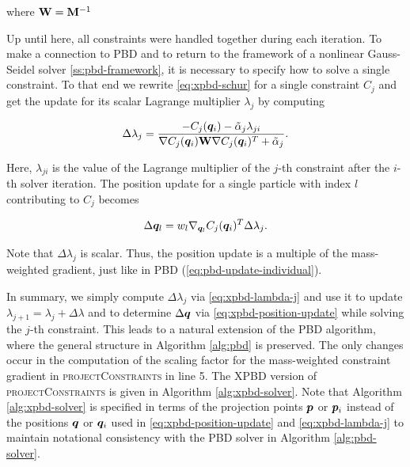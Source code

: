 \noindent where $\mathbf{W} = \mathbf{M}^{-1}$

Up until here, all constraints were handled together during each iteration. To make a connection to PBD and to return to the framework of a
nonlinear Gauss-Seidel solver \cref{ss:pbd-framework}, it is necessary to specify how to solve a single constraint. To that end we rewrite 
\autoref{eq:xpbd-schur} for a single constraint $C_j$ and get the update for its scalar Lagrange multiplier $\lambda_j$ by computing

\begin{equation}\label{eq:xpbd-lambda-j}
    \Delta \lambda_j = \frac{-C_j(\bm{q}_i) - \tilde{\alpha}_j \lambda_{ji}}{\nabla C_j(\bm{q}_i) \mathbf{W} \nabla C_j(\bm{q}_i)^T + \tilde{\alpha}_j}.
\end{equation}

\noindent Here, $\lambda_{ji}$ is the value of the Lagrange multiplier of the $j$-th constraint after the $i$-th solver iteration. The position update for 
a single particle with index $l$ contributing to $C_j$ becomes

\begin{equation}\label{eq:xpbd-position-update-i}
    \Delta \bm{q}_l = w_l \nabla_{\bm{q}_l} C_j(\bm{q}_i)^T \Delta \lambda_j.
\end{equation}

\noindent Note that $\Delta \lambda_j$ is scalar. Thus, the position update is a multiple of the mass-weighted gradient, just like in PBD 
(\cref{eq:pbd-update-individual}).

In summary, we simply compute $\Delta \lambda_j$ via \autoref{eq:xpbd-lambda-j} and use it to 
update $\lambda_{j+1} = \lambda_j + \Delta \lambda$ and to determine $\Delta \bm{q}$ via \autoref{eq:xpbd-position-update} while solving the $j$-th constraint. 
This leads to a natural extension of the PBD algorithm, where the general structure in Algorithm \ref{alg:pbd} is preserved. The only changes occur in the 
computation of the scaling factor for the 
mass-weighted constraint gradient in \textsc{projectConstraints} in line 5. The XPBD version of \textsc{projectConstraints} is given in 
Algorithm \ref{alg:xpbd-solver}. Note that Algorithm \ref{alg:xpbd-solver} is specified in terms of the projection points $\bm{p}$ or $\bm{p}_i$ instead of the 
positions $\bm{q}$ or $\bm{q}_i$ used in \autoref{eq:xpbd-position-update} and \autoref{eq:xpbd-lambda-j} to maintain notational consistency with the
PBD solver in Algorithm \ref{alg:pbd-solver}.

